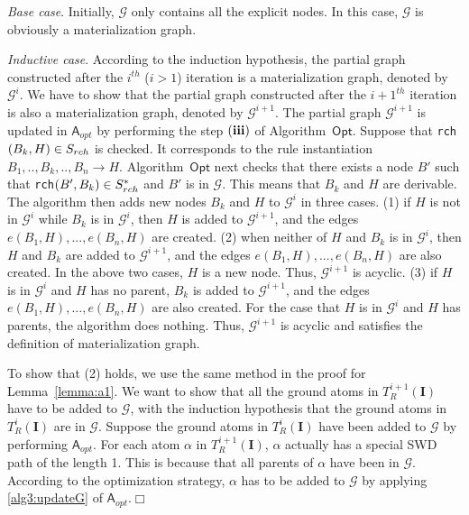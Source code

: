 \emph{Base case}. Initially, $\mathcal{G}$ only contains all the explicit nodes.
In this case, $\mathcal{G}$ is obviously a materialization graph.

\emph{Inductive case}.
According to the induction hypothesis, the partial graph constructed after
the $i^{th}$ ($i>1$) iteration is a materialization graph, denoted by $\mathcal{G}^{i}$.
We have to show that the partial graph constructed after the $i+1^{th}$ iteration is
also a materialization graph, denoted by $\mathcal{G}^{i+1}$.
The partial graph $\mathcal{G}^{i+1}$ is updated in $\mathsf{A}_{opt}$ by performing the step $(\textbf{\romannumeral3})$
of Algorithm~$\mathsf{Opt}$.
Suppose that \texttt{rch}$(B_k,H)\in S_{\tiny rch}$ is checked.
It corresponds to the rule instantiation $B_1,..,B_k,..,B_n\rightarrow H$.
Algorithm~$\mathsf{Opt}$ next checks that there exists a node $B'$ such that
\texttt{rch}$(B',B_k)\in S^*_{\tiny rch}$
and $B'$ is in $\mathcal{G}$. This means that $B_k$ and $H$ are derivable.
The algorithm then adds new nodes $B_k$ and $H$ to $\mathcal{G}^{i}$ in three cases.
(1) if $H$ is not in $\mathcal{G}^{i}$ while $B_k$ is in $\mathcal{G}^{i}$,
then $H$ is added to $\mathcal{G}^{i+1}$, and the edges $e(B_1, H),...,e(B_n, H)$ are created.
(2) when neither of $H$ and $B_k$ is in $\mathcal{G}^{i}$,
then $H$ and $B_k$ are added to $\mathcal{G}^{i+1}$, and the edges $e(B_1, H),...,e(B_n, H)$ are also created.
In the above two cases, $H$ is a new node. Thus,
$\mathcal{G}^{i+1}$ is acyclic.
(3) if $H$ is in $\mathcal{G}^{i}$ and $H$ has no parent,
$B_k$ is added to $\mathcal{G}^{i+1}$, and the edges $e(B_1, H),...,e(B_n, H)$ are also created.
For the case that $H$ is in $\mathcal{G}^{i}$ and $H$ has parents,
the algorithm does nothing.
Thus, $\mathcal{G}^{i+1}$ is acyclic and satisfies the definition of materialization graph.

To show that (2) holds, we use the same method in the proof for Lemma~\ref{lemma:a1}.
We want to show that all the ground atoms in $T_R^{i+1}(\textbf{I})$ have to be added to $\mathcal{G}$,
with the induction hypothesis that the ground atoms in $T_R^{i}(\textbf{I})$ are in $\mathcal{G}$.
Suppose the ground atoms in $T_R^{i}(\textbf{I})$ have been added to $\mathcal{G}$ by
performing $\mathsf{A}_{opt}$.
For each atom $\alpha$ in $T_R^{i+1}(\textbf{I})$, $\alpha$ actually has a special SWD path
of the length 1. This is because that all parents of $\alpha$ have been in $\mathcal{G}$.
According to the optimization strategy, $\alpha$ has to be added to $\mathcal{G}$ by applying \ref{alg3:updateG}
of $\mathsf{A}_{opt}$.\hfill$\Box$


